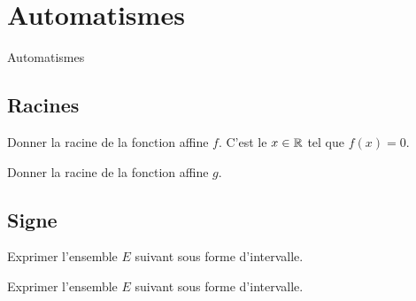 
\AdvanceDate[2]



\section{Automatismes}

\begin{frame}

\centering \huge
Automatismes


\end{frame}

\subsection{Racines}

\begin{frame}{1}	
	Donner la racine de la fonction affine $f$. C'est le $x\in\mathbb{R}$ tel que $f(x) = 0$.
	\boxAB{
		\[ f(x) = \dfrac23 x - 2. \]
	}{
		\[ f(x) = -\dfrac65x - 3. \]
	}
\end{frame}

\begin{frame}{2}
	Donner la racine de la fonction affine $g$.
	\boxAB{
		\[ g(x) = \dfrac12 - 2x. \]
	}{
		\[ g(x) = \dfrac23 + x. \]
	}
\end{frame}

\subsection{Signe}

\begin{frame}{3}

	Exprimer l'ensemble $E$ suivant sous forme d'intervalle.
		
	\boxAB{
		\[ E = \left\{ x \in \R \text{ tq. } -\dfrac65x - 3 \geq 0 \right\}. \]
	}{
		\[ E = \left\{ x \in \R \text{ tq. } \dfrac23 x - 2 \geq 0 \right\}. \]
	}
\end{frame}

\begin{frame}{4}

	Exprimer l'ensemble $E$ suivant sous forme d'intervalle.
		
	\boxAB{
		\[ E = \left\{ x \in \R \text{ tq. } \dfrac23 + x \geq 0 \right\}. \]
	}{
		\[ E = \left\{ x \in \R \text{ tq. } \dfrac12 - 2x \geq 0 \right\}. \]
	}
\end{frame}


